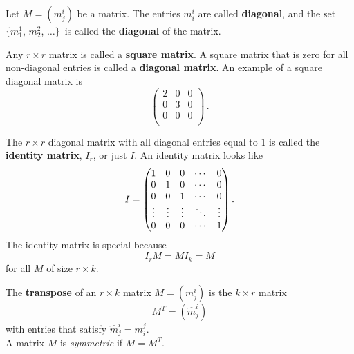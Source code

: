 \begin{definition}  
Let $M=(m^i_j)$ be a matrix. The entries $m_i^i$ are called {\bfseries diagonal}, and the set $\{m_1^1$, $m_2^2$, $\ldots \}$~is called the {\bfseries diagonal} of the matrix.

Any $r\times r$ matrix is called a {\bfseries square matrix}.  A square matrix that is zero for all non-diagonal entries is called a {\bfseries diagonal matrix}. An example of a square diagonal matrix is
\[\begin{pmatrix}
2 & 0 & 0\\
0 & 3 & 0\\
0 & 0 & 0\\
\end{pmatrix}\, .\]

The $r\times r$ diagonal matrix with all diagonal entries equal to $1$ is called the {\bfseries identity matrix}, $I_r$, or just $I$.  An identity matrix looks like \[ I=
\begin{pmatrix}
1 & 0 & 0 & \cdots & 0 \\
0 & 1 & 0 & \cdots & 0 \\
0 & 0 & 1 & \cdots & 0 \\
\multicolumn{1}{c}{\vdots} & \multicolumn{1}{c}{\vdots} & \multicolumn{1}{c}{\vdots} & \ddots & \multicolumn{1}{c}{\vdots} \\
0 & 0 & 0 & \cdots & 1
\end{pmatrix}.
\]
The identity matrix is special because \[I_rM=MI_k=M\] for all $M$ of size $r\times k$.
\end{definition}



\begin{definition}
The {\bfseries transpose} of an $r\times k$ matrix $M = (m_j^i)$ is the $k\times r$ matrix 
\[
M^T = (\hat{m}_j^i)
\]
with entries that satisfy $\hat{m}_j^i = m_i^j$. \\

A matrix $M$ is \emph{symmetric} if $M=M^T$.
\end{definition}


